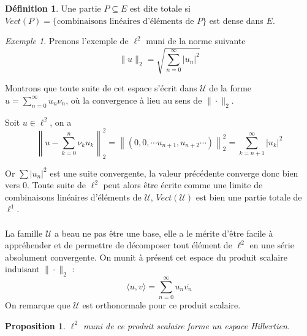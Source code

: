 \documentclass[]{article}
\newtheorem{myproposition}{Proposition}
\theoremstyle{remark}
\newtheorem{myexmpl}{Exemple}
\theoremstyle{definition}
\newtheorem{mydef}{Définition}
\newcommand{\DS}{\displaystyle}
\begin{document}
	\begin{mydef}
		Une partie $P \subseteq E$ est dite totale si $Vect(P) = \{\text{combinaisons linéaires d'éléments de $P$}\}$ est dense dans $E$.
	\end{mydef}
	
	\begin{myexmpl}
		Prenons l'exemple de $\ell^2$ muni de la norme suivante $$\|u\|_2 = \sqrt{\sum_{n = 0}^\infty |u_n|^2}$$
		
		Montrons que toute suite de cet espace s'écrit dans $\mathcal{U}$ de la forme $\DS u = \sum_{n = 0}^\infty u_n \nu_n$, où la convergence à lieu au sens de $\|\cdot\|_2$.
		
		Soit $u \in \ell^2$, on a $$\left\|u - \sum_{k = 0}^{n} \nu_k u_k\right\|_2^2 = \left\|(0, 0, \cdots u_{n+1}, u_{n+2} \cdots)\right\|_2^2 = \sum_{k = n+1}^\infty |u_k|^2$$
		
		Or $\sum |u_n|^2$ est une suite convergente, la valeur précédente converge donc bien vers 0. Toute suite de $\ell^2$ peut alors être écrite comme une limite de combinaisons linéaires d'éléments de $\mathcal{U}$, $Vect(\mathcal{U})$ est bien une partie totale de $\ell^1$.
	\end{myexmpl}
	
	\paragraph*{}
	La famille $\mathcal{U}$ a beau ne pas être une base, elle a le mérite d'être facile à appréhender et de permettre de décomposer tout élément de $\ell^2$ en une série absolument convergente. On munit à présent cet espace du produit scalaire induisant $\|\cdot\|_2$ : $$\langle u, v \rangle = \sum_{n = 0}^\infty u_n \overline{v_n}$$
	On remarque que $\mathcal{U}$ est orthonormale pour ce produit scalaire.
	
	\begin{myproposition}
		$\ell^2$ muni de ce produit scalaire forme un espace Hilbertien.
	\end{myproposition}
\end{document}
